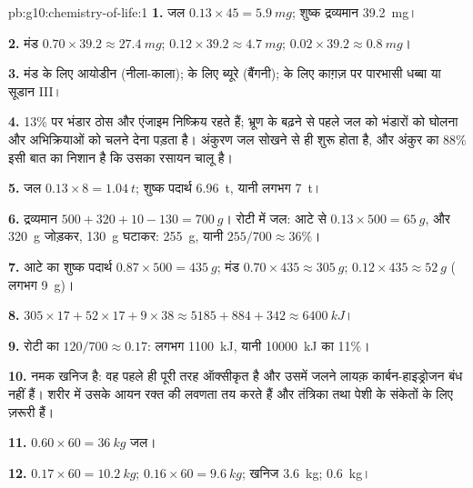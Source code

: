\begin{solution}{pb:g10:chemistry-of-life:1}
\textbf{1.} जल $0.13 \times 45 = \qty{5.9}{mg}$; शुष्क द्रव्यमान
\qty{39.2}{mg}।

\textbf{2.} मंड $0.70 \times 39.2 \approx \qty{27.4}{mg}$; 
$0.12 \times 39.2 \approx \qty{4.7}{mg}$;  $0.02 \times 39.2
\approx \qty{0.8}{mg}$।

\textbf{3.} मंड के लिए आयोडीन (नीला-काला);  के लिए ब्यूरे
(बैंगनी);  के लिए काग़ज़ पर पारभासी धब्बा या सूडान III।

\textbf{4.} 13\% पर भंडार ठोस और एंजाइम निष्क्रिय रहते हैं; भ्रूण के
बढ़ने से पहले जल को भंडारों को घोलना और अभिक्रियाओं को चलने देना पड़ता
है। अंकुरण जल सोखने से ही शुरू होता है, और अंकुर का 88\% इसी बात का
निशान है कि उसका रसायन चालू है।

\textbf{5.} जल $0.13 \times 8 = \qty{1.04}{t}$; शुष्क पदार्थ
\qty{6.96}{t}, यानी लगभग \qty{7}{t}।

\textbf{6.} द्रव्यमान $500 + 320 + 10 - 130 = \qty{700}{g}$। रोटी में
जल: आटे से $0.13 \times 500 = \qty{65}{g}$, और \qty{320}{g} जोड़कर,
\qty{130}{g} घटाकर: \qty{255}{g}, यानी $255/700 \approx 36\%$।

\textbf{7.} आटे का शुष्क पदार्थ $0.87 \times 500 = \qty{435}{g}$; मंड
$0.70 \times 435 \approx \qty{305}{g}$;  $0.12 \times 435 \approx
\qty{52}{g}$ ( लगभग \qty{9}{g})।

\textbf{8.} $305 \times 17 + 52 \times 17 + 9 \times 38 \approx 5185 +
884 + 342 \approx \qty{6400}{kJ}$।

\textbf{9.} रोटी का $120/700 \approx 0.17$: लगभग \qty{1100}{kJ}, यानी
\qty{10000}{kJ} का 11\%।

\textbf{10.} नमक खनिज है: वह पहले ही पूरी तरह ऑक्सीकृत है और उसमें जलने
लायक़ कार्बन-हाइड्रोजन बंध नहीं हैं। शरीर में उसके आयन रक्त की लवणता तय
करते हैं और तंत्रिका तथा पेशी के संकेतों के लिए ज़रूरी हैं।

\textbf{11.} $0.60 \times 60 = \qty{36}{kg}$ जल।

\textbf{12.}  $0.17 \times 60 = \qty{10.2}{kg}$;  $0.16
\times 60 = \qty{9.6}{kg}$; खनिज \qty{3.6}{kg}; 
\qty{0.6}{kg}।


\end{solution}
